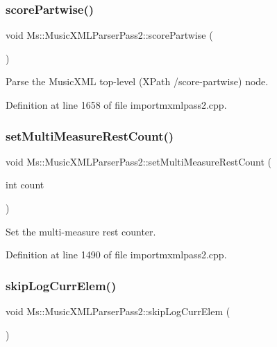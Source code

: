 \subsubsection{\texorpdfstring{score\+Partwise()}{scorePartwise()}}
{\footnotesize\ttfamily void Ms\+::\+Music\+X\+M\+L\+Parser\+Pass2\+::score\+Partwise (\begin{DoxyParamCaption}{ }\end{DoxyParamCaption})}

Parse the Music\+X\+ML top-\/level (X\+Path /score-\/partwise) node. 

Definition at line 1658 of file importmxmlpass2.\+cpp.

\mbox{\label{class_ms_1_1_music_x_m_l_parser_pass2_aad5e88f33bef3012d988e10141c2b3a4}} 
\subsubsection{\texorpdfstring{set\+Multi\+Measure\+Rest\+Count()}{setMultiMeasureRestCount()}}
{\footnotesize\ttfamily void Ms\+::\+Music\+X\+M\+L\+Parser\+Pass2\+::set\+Multi\+Measure\+Rest\+Count (\begin{DoxyParamCaption}\item[{int}]{count }\end{DoxyParamCaption})}

Set the multi-\/measure rest counter. 

Definition at line 1490 of file importmxmlpass2.\+cpp.

\mbox{\label{class_ms_1_1_music_x_m_l_parser_pass2_a3faf1fc79c6220380fb79e9cf6723863}} 
\subsubsection{\texorpdfstring{skip\+Log\+Curr\+Elem()}{skipLogCurrElem()}}
{\footnotesize\ttfamily void Ms\+::\+Music\+X\+M\+L\+Parser\+Pass2\+::skip\+Log\+Curr\+Elem (\begin{DoxyParamCaption}{ }\end{DoxyParamCaption})}

